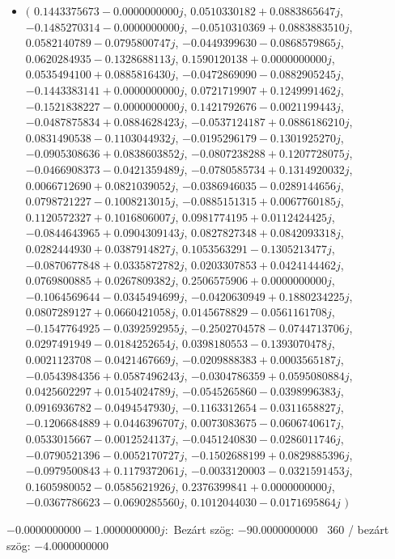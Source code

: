 \documentclass[14pt,a4paper]{article}
\begin{document}
\begin{itemize}
\item
$\big($
$0.1443375673-0.0000000000j$, $0.0510330182+0.0883865647j$, $-0.1485270314-0.0000000000j$, $-0.0510310369+0.0883883510j$, $0.0582140789-0.0795800747j$, $-0.0449399630-0.0868579865j$, $0.0620284935-0.1328688113j$, $0.1590120138+0.0000000000j$, $0.0535494100+0.0885816430j$, $-0.0472869090-0.0882905245j$, $-0.1443383141+0.0000000000j$, $0.0721719907+0.1249991462j$, $-0.1521838227-0.0000000000j$, $0.1421792676-0.0021199443j$, $-0.0487875834+0.0884628423j$, $-0.0537124187+0.0886186210j$, $0.0831490538-0.1103044932j$, $-0.0195296179-0.1301925270j$, $-0.0905308636+0.0838603852j$, $-0.0807238288+0.1207728075j$, $-0.0466908373-0.0421359489j$, $-0.0780585734+0.1314920032j$, $0.0066712690+0.0821039052j$, $-0.0386946035-0.0289144656j$, $0.0798721227-0.1008213015j$, $-0.0885151315+0.0067760185j$, $0.1120572327+0.1016806007j$, $0.0981774195+0.0112424425j$, $-0.0844643965+0.0904309143j$, $0.0827827348+0.0842093318j$, $0.0282444930+0.0387914827j$, $0.1053563291-0.1305213477j$, $-0.0870677848+0.0335872782j$, $0.0203307853+0.0424144462j$, $0.0769800885+0.0267809382j$, $0.2506575906+0.0000000000j$, $-0.1064569644-0.0345494699j$, $-0.0420630949+0.1880234225j$, $0.0807289127+0.0660421058j$, $0.0145678829-0.0561161708j$, $-0.1547764925-0.0392592955j$, $-0.2502704578-0.0744713706j$, $0.0297491949-0.0184252654j$, $0.0398180553-0.1393070478j$, $0.0021123708-0.0421467669j$, $-0.0209888383+0.0003565187j$, $-0.0543984356+0.0587496243j$, $-0.0304786359+0.0595080884j$, $0.0425602297+0.0154024789j$, $-0.0545265860-0.0398996383j$, $0.0916936782-0.0494547930j$, $-0.1163312654-0.0311658827j$, $-0.1206684889+0.0446396707j$, $0.0073083675-0.0606740617j$, $0.0533015667-0.0012524137j$, $-0.0451240830-0.0286011746j$, $-0.0790521396-0.0052170727j$, $-0.1502688199+0.0829885396j$, $-0.0979500843+0.1179372061j$, $-0.0033120003-0.0321591453j$, $0.1605980052-0.0585621926j$, $0.2376399841+0.0000000000j$, $-0.0367786623-0.0690285560j$, $0.1012044030-0.0171695864j$
$\big)$
\end{itemize}
$-0.0000000000-1.0000000000j$:\
Bezárt szög: $-90.0000000000$ \
360 / bezárt szög: $-4.0000000000$\
\end{document}
